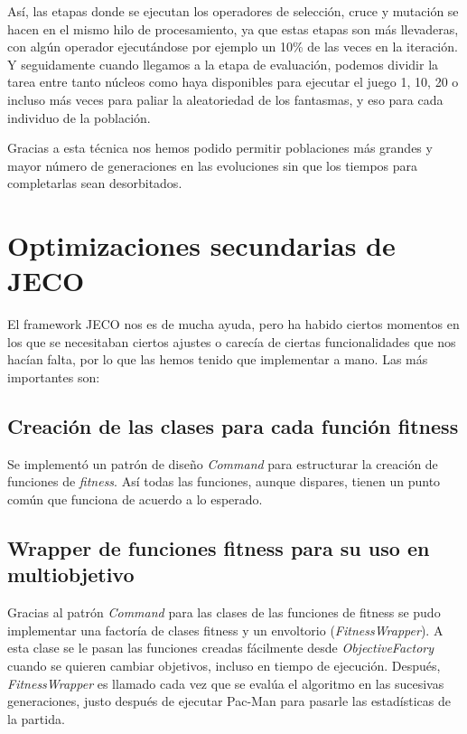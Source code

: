 Así, las etapas donde se ejecutan los operadores de selección, cruce y mutación se hacen en el mismo hilo de procesamiento, ya que estas etapas son más llevaderas, con algún operador ejecutándose por ejemplo un 10\% de las veces en la iteración. Y seguidamente cuando llegamos a la etapa de evaluación, podemos dividir la tarea entre tanto núcleos como haya disponibles para ejecutar el juego 1, 10, 20 o incluso más veces para paliar la aleatoriedad de los fantasmas, y eso para cada individuo de la población.

Gracias a esta técnica nos hemos podido permitir poblaciones más grandes y mayor número de generaciones en las evoluciones sin que los tiempos para completarlas sean desorbitados.


\section{Optimizaciones secundarias de JECO}
El framework JECO nos es de mucha ayuda, pero ha habido ciertos momentos en los que se necesitaban ciertos ajustes o carecía de ciertas funcionalidades que nos hacían falta, por lo que las hemos tenido que implementar a mano. Las más importantes son:

\subsection{Creación de las clases para cada función fitness}
Se implementó un patrón de diseño \textit{Command} para estructurar la creación de funciones de \textit{fitness}. Así todas las funciones, aunque dispares, tienen un punto común que funciona de acuerdo a lo esperado.

\subsection{Wrapper de funciones fitness para su uso en multiobjetivo} \label{sec:multi}
Gracias al patrón \textit{Command} para las clases de las funciones de fitness se pudo implementar una factoría de clases fitness y un envoltorio (\textit{FitnessWrapper}). A esta clase se le pasan las funciones creadas fácilmente desde \textit{ObjectiveFactory} cuando se quieren cambiar objetivos, incluso en tiempo de ejecución. Después, \textit{FitnessWrapper} es llamado cada vez que se evalúa el algoritmo en las sucesivas generaciones, justo después de ejecutar Pac-Man para pasarle las estadísticas de la partida.

